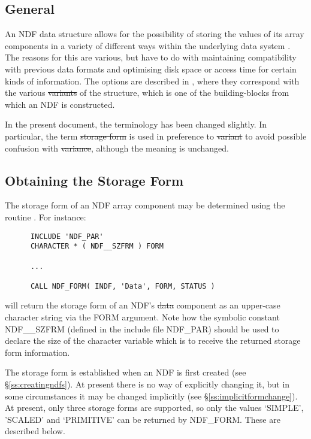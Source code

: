 \subsection{General}

An NDF data structure allows for the possibility of storing the values of 
its array components in a variety of different ways within the underlying 
data system .
The reasons for this are various, but have to do with maintaining
compatibility with previous data formats and optimising disk space or access
time for certain kinds of information.
The options are described in , where they
correspond with the various
\st{variants\/} of the  structure, which is one
of the building-blocks from which an NDF is constructed. 

In the present document, the terminology has been changed slightly.
In particular, the term \st{storage form\/} is used in preference to
\st{variant\/} to avoid possible confusion with \st{variance},
although the meaning is unchanged.

\subsection{Obtaining the Storage Form}

The storage form of an NDF array component may be determined using the 
routine .
For instance:

\small
\begin{verbatim}
      INCLUDE 'NDF_PAR'
      CHARACTER * ( NDF__SZFRM ) FORM

      ...

      CALL NDF_FORM( INDF, 'Data', FORM, STATUS )
\end{verbatim}
\normalsize

will return the storage form of an NDF's \st{data\/} component as an
upper-case character string via the FORM argument.
Note how the symbolic constant NDF\_\_SZFRM (defined in the include file 
NDF\_PAR) should be used to declare the size of the character variable which 
is to receive the returned storage form information.

The storage form is established when an NDF is first created (see
\S\ref{ss:creatingndfs}).
At present there is no way of explicitly changing it, but in some
circumstances it may be changed implicitly (see
\S\ref{ss:implicitformchange}). 
At present, only three storage forms are supported, so only the values
`SIMPLE', 'SCALED' and `PRIMITIVE' can be returned by NDF\_FORM. 
These are described below.

